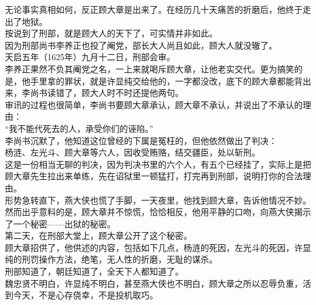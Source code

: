\begin{multicols}{\theparacolNo}
无论事实真相如何，反正顾大章是出来了。在经历几十天痛苦的折磨后，他终于走出了地狱。\\

按说到了刑部，就是顾大人的天下了，可实情并非如此。\\

因为刑部尚书李养正也投了阉党，部长大人尚且如此，顾大人就没辙了。\\

天启五年（1625年）九月十二日，刑部会审。\\

李养正果然不负其阉党之名，一上来就喝斥顾大章，让他老实交代。更为搞笑的是，他手里拿的罪状，就是许显纯交给他的，一字都没改，底下的顾大章都能背出来，李尚书读错了，顾大人时不时还提他两句。\\

审讯的过程也很简单，李尚书要顾大章承认，顾大章不承认，并说出了不承认的理由：\\

“我不能代死去的人，承受你们的诬陷。”\\

李尚书沉默了，他知道这位曾经的下属是冤枉的，但他依然做出了判决：\\

杨涟、左光斗、顾大章等六人，因收受贿赂，结交疆臣，处以斩刑。\\

这是一份相当无聊的判决，因为判决书里的六个人，有五个已经挂了，实际上是把顾大章先生拉出来单练，先在诏狱里一顿猛打，打完再到刑部，说明打你的合法理由。\\

形势急转直下，燕大侠也慌了手脚，一天夜里，他找到顾大章，告诉他情况不妙。\\

然而出乎意料的是，顾大章并不惊慌，恰恰相反，他用平静的口吻，向燕大侠揭示了一个秘密——出狱的秘密。\\

第二天，在刑部大堂上，顾大章公开了这个秘密。\\

顾大章招供了，他供述的内容，包括如下几点，杨涟的死因，左光斗的死因，许显纯的刑罚操作方法，绝笔，无人性的折磨，无耻的谋杀。\\

刑部知道了，朝廷知道了，全天下人都知道了。\\

魏忠贤不明白，许显纯不明白，甚至燕大侠也不明白，顾大章之所以忍辱负重，活到今天，不是心存侥幸，不是投机取巧。\\


\end{multicols}
